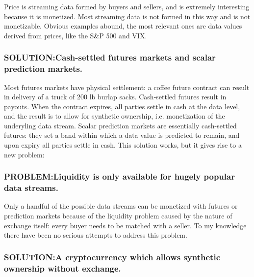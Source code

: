 \documentclass[11pt]{article}
\begin{document}
Price is streaming data formed by buyers and sellers, and is extremely
interesting because it is monetized. Most streaming data is not formed
in this way and is not monetizable. Obvious examples abound, the most
relevant ones are data values derived from prices, like the S\&P 500 and
VIX.

    \subsubsection{\texorpdfstring{SOLUTION:Cash-settled futures markets and
scalar prediction
markets.}{SOLUTION: Cash-settled futures markets and scalar prediction markets.}}\label{solution-cash-settled-futures-markets-and-scalar-prediction-markets.}

Most futures markets have physical settlement: a coffee future contract
can result in delivery of a truck of 200 lb burlap sacks. Cash-settled
futures result in payouts. When the contract expires, all parties settle
in cash at the data level, and the result is to allow for synthetic
ownership, i.e. monetization of the underyling data stream. Scalar
prediction markets are essentially cash-settled futures: they set a band
within which a data value is predicted to remain, and upon expiry all
parties settle in cash. This solution works, but it gives rise to a new
problem:

    \subsubsection{\texorpdfstring{PROBLEM:Liquidity is only available for
hugely popular data
streams.}{PROBLEM: Liquidity is only available for hugely popular data streams.}}\label{problem-liquidity-is-only-available-for-hugely-popular-data-streams.}

Only a handful of the possible data streams can be monetized with
futures or prediction markets because of the liquidity problem caused by
the nature of exchange itself: every buyer needs to be matched with a
seller. To my knowledge there have been no serious attempts to address
this problem.

    \subsubsection{\texorpdfstring{SOLUTION:A cryptocurrency which allows
synthetic ownership without
exchange.}{SOLUTION: A cryptocurrency which allows synthetic ownership without exchange.}}\label{solution-a-cryptocurrency-which-allows-synthetic-ownership-without-exchange.}
\end{document}
